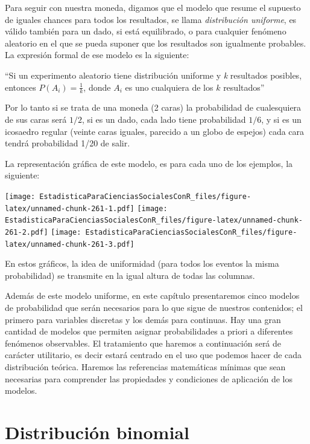 \documentclass[]{book}
\begin{document}
Para seguir con nuestra moneda, digamos que el modelo que resume el
supuesto de iguales chances para todos los resultados, se llama
\emph{distribución uniforme}, es válido también para un dado, si está
equilibrado, o para cualquier fenómeno aleatorio en el que se pueda
suponer que los resultados son igualmente probables. La expresión formal
de ese modelo es la siguiente:

``Si un experimento aleatorio tiene distribución uniforme y \emph{k}
resultados posibles, entonces \(P(A_{i}) = \frac{1}{k}\),
donde \(A_{i}\) es uno cualquiera de los \(k\) resultados''

Por lo tanto si se trata de una moneda (2 caras) la probabilidad de
cualesquiera de sus caras será \(1/2\), si es un dado, cada lado tiene
probabilidad \(1/6\), y si es un icosaedro regular (veinte caras iguales,
parecido a un globo de espejos) cada cara tendrá probabilidad 1/20 de
salir.

La representación gráfica de este modelo, es para cada uno de los
ejemplos, la siguiente:

\texttt{[image: EstadisticaParaCienciasSocialesConR\_files/figure-latex/unnamed-chunk-261-1.pdf]} \texttt{[image: EstadisticaParaCienciasSocialesConR\_files/figure-latex/unnamed-chunk-261-2.pdf]} \texttt{[image: EstadisticaParaCienciasSocialesConR\_files/figure-latex/unnamed-chunk-261-3.pdf]}

En estos gráficos, la idea de uniformidad (para todos los eventos la
misma probabilidad) se transmite en la igual altura de todas las
columnas.

Además de este modelo uniforme, en este capítulo presentaremos cinco
modelos de probabilidad que serán necesarios para lo que sigue de
nuestros contenidos; el primero para variables discretas y los demás
para continuas. Hay una gran cantidad de modelos que permiten asignar
probabilidades a priori a diferentes fenómenos observables. El
tratamiento que haremos a continuación será de carácter utilitario, es
decir estará centrado en el uso que podemos hacer de cada distribución
teórica. Haremos las referencias matemáticas mínimas que sean necesarias
para comprender las propiedades y condiciones de aplicación de los
modelos.

\hypertarget{distribuciuxf3n-binomial}{%
\section{Distribución binomial}\label{distribuciuxf3n-binomial}}
\end{document}
